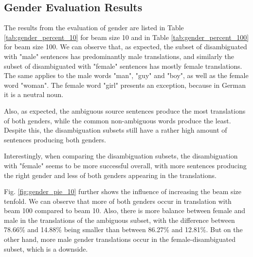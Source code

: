\subsection{Gender Evaluation Results}
\label{ch:Base_Experiment:Results:Gender}

The results from the evaluation of gender are listed in Table \ref{tab:gender_percent_10} for beam size 10 and in Table \ref{tab:gender_percent_100} for beam size 100. We can observe that, as expected, the subset of disambiguated with "male" sentences has predominantly male translations, and similarly the subset of disambiguated with "female" sentences has mostly female translations. The same applies to the male words "man", "guy" and "boy", as well as the female word "woman". The female word "girl" presents an exception, because in German it is a neutral noun.

Also, as expected, the ambiguous source sentences produce the most translations of both genders, while the common non-ambiguous words produce the least. Despite this, the disambiguation subsets still have a rather high amount of sentences producing both genders. 

Interestingly, when comparing the disambiguation subsets, the disambiguation with "female" seems to be more successful overall, with more sentences producing the right gender and less of both genders appearing in the translations.

Fig. \ref{fig:gender_pie_10} further shows the influence of increasing the beam size tenfold. We can observe that more of both genders occur in translation with beam 100 compared to beam 10. Also, there is more balance between female and male in the translations of the ambiguous subset, with the difference between 78.66\% and 14.88\% being smaller than between 86.27\% and 12.81\%. But on the other hand, more male gender translations occur in the female-disambiguated subset, which is a downside.

